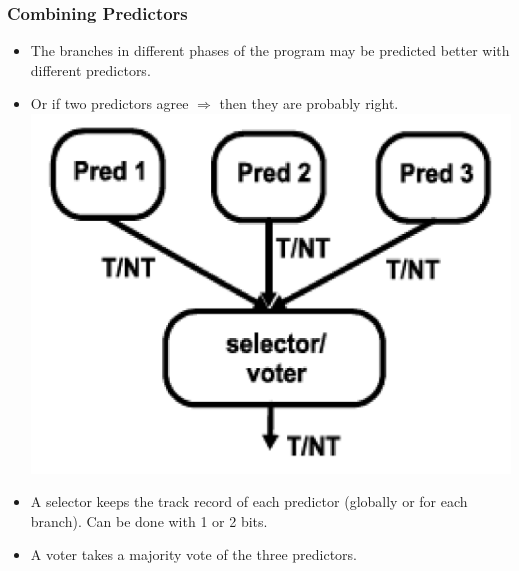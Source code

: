 \documentclass{beamer}
\begin{document}
\begin{frame}[fragile,t]
\frametitle{Combining Predictors}

\begin{itemize}
    \item The branches in different phases of the program may be predicted
            better with different predictors.
    \item Or if two predictors agree $\Rightarrow$ then they are probably right.\\

\includegraphics[width=29ex]{FigsOoOProc/CombPredictors.pdf}\pause
 
     
    \item A selector keeps the track record of each predictor
            (globally or for each branch). Can be done with 1 or 2 bits.
    \item A voter takes a majority vote of the three predictors.
\end{itemize}
\end{frame}
\end{document}
